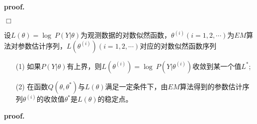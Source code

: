\textbf{proof.}

$\Box$

\begin{framed}
    \begin{theorem}
        设$L(\theta)=\log\ P(Y|\theta)$为观测数据的对数似然函数，$\theta^{(i)}(i=1,2,\cdots)$为$EM$算法对参数估计序列，$L(\theta^{(i)})(i=1,2,\cdots)$对应的对数似然函数序列
        \begin{enumerate}[itemindent=2em]
            \item[(1)] 如果$P(Y|\theta)$有上界，则$L(\theta^{(i)})=\log\ P(Y|\theta^{(i)})$收敛到某一个值$L^*$;
            \item[(2)] 在函数$Q(\theta,\theta^*)$与$L(\theta)$满足一定条件下，由$EM$算法得到的参数估计序列$\theta^{(i)}$的收敛值$\theta^*$是$L(\theta)$的稳定点。
        \end{enumerate}
    \end{theorem}
\end{framed}

\textbf{proof.}